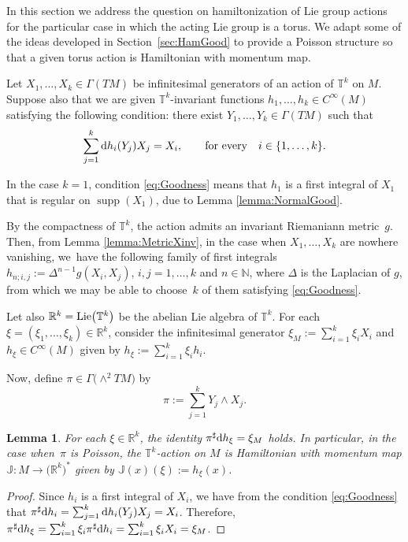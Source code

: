\documentclass[10pt,a4paper]{amsart}
\newcommand{\R}[1]{\mathbb{R}^{#1}}
\newcommand{\dd}{{\rm d}}
\numberwithin{equation}{section}
\newtheorem{Lemma}[Theorem]{Lemma}
\begin{document}
In this section we address the question on hamiltonization of Lie group actions for the particular case in which the acting Lie group is a torus. We adapt some of the ideas developed in Section~\ref{sec:HamGood} to provide a Poisson structure so that a given torus action is Hamiltonian with momentum map.

Let $X_{1}, \dots, X_{k} \in \Gamma(TM)$ be infinitesimal generators of an action of $\mathbb{T}^{k}$ on $M$. Suppose also that we are given $\mathbb{T}^{k}$-invariant functions $h_{1},\dots,h_{k} \in C^{\infty}(M)$ satisfying the following condition: there exist $Y_1,\dots,Y_{k} \in \Gamma(TM)$ such that
 \begin{equation}\label{eq:Goodness}
 \sum_{j=1}^{k}\dd h_{i}(Y_{j})X_{j} = X_{i},\qquad \text{for every}\quad i \in \{1,\dots,k\}.
 \end{equation}

\begin{Remark}
In the case $k=1$, condition \eqref{eq:Goodness} means that $h_{1}$ is a first integral of $X_{1}$ that is regular on $\operatorname{supp}(X_{1})$, due to Lemma \ref{lemma:NormalGood}.
\end{Remark}

\begin{Remark}
By the compactness of $\mathbb{T}^k$, the action admits an invariant Riema\-niann metric~$g$. Then, from Lemma \ref{lemma:MetricXinv}, in the case when $X_1, \dots, X_{k}$ are nowhere vanishing, we~have the following family of first integrals $h_{n;i,j}:=\Delta^{n-1}g(X_i,X_j)$, $i,j=1,\dots,k$ and $n\in\mathbb{N}$, where $\Delta$ is the Laplacian of $g$, from which we may be able to choose~$k$ of them satisfying \eqref{eq:Goodness}.
\end{Remark}

Let also $\R{k} = {\rm Lie}\big(\mathbb{T}^{k}\big)$ be the abelian Lie algebra of $\mathbb{T}^{k}$. For each $\xi = (\xi_1,\dots,\xi_{k}) \in \R{k}$, consider the infinitesimal generator $\xi_{M} := \sum_{i=1}^{k}\xi_{i}X_{i}$ and $h_{\xi} \in C^{\infty}(M)$ given by $h_{\xi} := \sum_{i=1}^{k}\xi_{i}h_{i}$.

Now, define $\pi \in \Gamma\big({\wedge}^{2}TM\big)$ by
 \begin{equation}\label{eq:PoissTorus}
 \pi := \sum_{j=1}^{k}Y_{j}\wedge X_{j}.
 \end{equation}

\begin{Lemma}\label{lemma:PoissToric0}
For each $\xi \in \R{k}$, the identity $\pi^{\sharp}\dd h_{\xi} = \xi_{M}$ holds. In particular, in the case when~$\pi$ is Poisson, the $\mathbb{T}^{k}$-action on $M$ is Hamiltonian with momentum map $\mathbb{J}\colon M \to \big(\R{k}\big)^{*}$ given by $\mathbb{J}(x)(\xi) := h_{\xi}(x)$.
\end{Lemma}
\begin{proof}
Since $h_{i}$ is a first integral of $X_{i}$, we have from the condition \eqref{eq:Goodness} that $\pi^{\sharp} \dd h_{i} = \sum_{j=1}^{k} \dd h_{i} (Y_{j}) X_{j} = X_{i}$. Therefore, $\pi^{\sharp}\dd h_{\xi} = \sum_{i=1}^{k}\xi_{i}\pi^{\sharp}\dd h_{i} = \sum_{i=1}^{k}\xi_{i}X_{i} = \xi_{M}$.
\end{proof}
\end{document}
